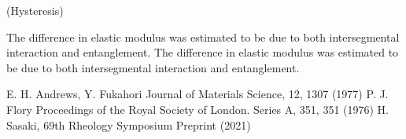 \documentclass[uplatex,dvipdfmx,a4paper,12pt]{article}
\begin{document}

(Hysteresis)

The difference in elastic modulus was estimated to be due to both intersegmental interaction and entanglement.
The difference in elastic modulus was estimated to be due to both intersegmental interaction and entanglement.


\begin{thebibliography}{99}
    \small %
    \setlength{\itemsep}{-2pt} %
     E. H. Andrews, Y. Fukahori Journal of Materials Science, 12, 1307 (1977)
     P. J. Flory Proceedings of the Royal Society of London. Series A, 351, 351 (1976)
     H. Sasaki, 69th Rheology Symposium Preprint (2021)
\end{thebibliography}
\end{document}
